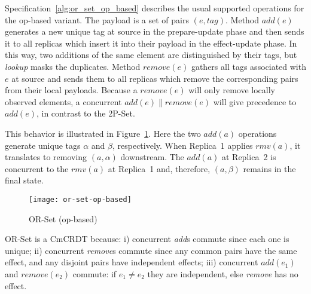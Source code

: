 Specification~\ref{alg:or_set_op_based} describes the usual supported operations
for the op-based variant. The payload is a set of pairs
$(\textit{e},\textit{tag})$. Method $\textit{add}(e)$ generates a new unique tag
at source in the prepare-update phase and then sends it to all replicas which
insert it into their payload in the effect-update phase. In this way, two
additions of the same element are distinguished by their tags, but
\textit{lookup} masks the duplicates. Method $\textit{remove}(e)$ gathers all
tags associated with $e$ at source and sends them to all replicas which remove
the corresponding pairs from their local payloads. Because a
$\textit{remove}(e)$ will only remove locally observed elements, a concurrent
$\textit{add}(e) \parallel \textit{remove}(e)$ will give precedence to
$\textit{add}(e)$, in contrast to the 2P-Set.

This behavior is illustrated in Figure~\ref{fig:or_set_op_based}. Here the two
$\textit{add}(a)$ operations generate unique tags $\alpha$ and $\beta$,
respectively. When Replica~1 applies $\textit{rmv}(a)$, it translates to
removing $(a, \alpha)$ downstream. The $\textit{add}(a)$ at Replica~2 is
concurrent to the $\textit{rmv}(a)$ at Replica~1 and, therefore, $(a, \beta)$
remains in the final state. 

\begin{figure}[b]
  \centering
  \begin{minipage}{1\linewidth}
    \centering
    \texttt{[image: or-set-op-based]}
    \caption{OR-Set (op-based)}
    \label{fig:or_set_op_based}
  \end{minipage}
\end{figure}

OR-Set is a CmCRDT because: i) concurrent \textit{add}s commute since each one is
unique; ii) concurrent \textit{remove}s commute since any common pairs have the
same effect, and any disjoint pairs have independent effects; iii) concurrent
$\textit{add}(e_{1})$ and $\textit{remove}(e_{2})$ commute: if $e_{1} \neq
e_{2}$ they are independent, else \textit{remove} has no effect.

